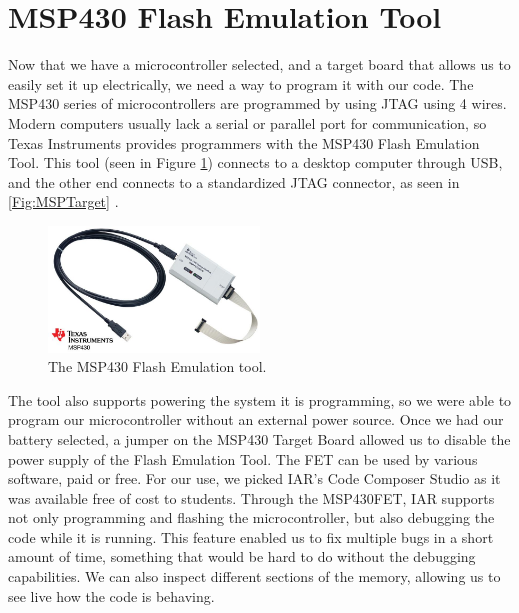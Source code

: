 \section{MSP430 Flash Emulation Tool}
\label{Sec:MSP430FET}
Now that we have a microcontroller selected, and a target board that allows us to easily set it up electrically, we need a way to program it with our code. The MSP430 series of microcontrollers are programmed by using JTAG using 4 wires. Modern computers usually lack a serial or parallel port for communication, so Texas Instruments provides programmers with the MSP430 Flash Emulation Tool. This tool (seen in Figure \ref{Fig:MSP430FET}) connects to a desktop computer through USB, and the other end connects to a standardized JTAG connector, as seen in \ref{Fig:MSPTarget} \cite{Web:MSPFETPAGE}. 
\begin{figure}
\begin{center}
\includegraphics[width=0.5\textwidth]{images/MSP430FETUIF.jpg}
\caption{The MSP430 Flash Emulation tool.}
\label{Fig:MSP430FET}
\end{center}
\end{figure}

The tool also supports powering the system it is programming, so we were able to program our microcontroller without an external power source. Once we had our battery selected, a jumper on the MSP430 Target Board allowed us to disable the power supply of the Flash Emulation Tool. The FET can be used by various software, paid or free. For our use, we picked IAR's Code Composer Studio as it was available free of cost to students. Through the MSP430FET, IAR supports not only programming and flashing the microcontroller, but also debugging the code while it is running. This feature enabled us to fix multiple bugs in a short amount of time, something that would be hard to do without the debugging capabilities. We can also inspect different sections of the memory, allowing us to see live how the code is behaving.

